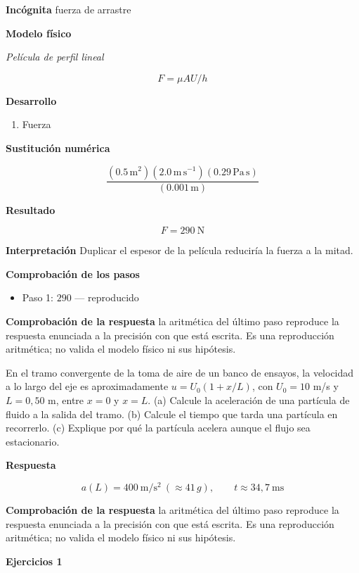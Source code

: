 \documentclass[10pt,openany]{book}
\begin{document}
\noindent\textbf{Incógnita}
fuerza de arrastre

\noindent\textbf{Modelo físico}

\noindent\textit{Película de perfil lineal}

\[
F = \mu A U/h
\]

\noindent\textbf{Desarrollo}
\begin{enumerate}
\item
Fuerza
\end{enumerate}

\noindent\textbf{Sustitución numérica}

\[
\frac{\left(0.5\,\mathrm{m}^{2}\right) \left(2.0\,\mathrm{m}\,\mathrm{s}^{-1}\right) \left(0.29\,\mathrm{Pa}\,\mathrm{s}\right)}{\left(0.001\,\mathrm{m}\right)}
\]

\noindent\textbf{Resultado}

\[
F = 290\ \mathrm{N}
\]

\noindent\textbf{Interpretación}
Duplicar el espesor de la película reduciría la fuerza a la mitad.

\noindent\textbf{Comprobación de los pasos}
\begin{itemize}
\item Paso 1: $290$ — reproducido
\end{itemize}

\noindent\textbf{Comprobación de la respuesta} la aritmética del último paso reproduce la respuesta enunciada a la precisión con que está escrita. Es una reproducción aritmética; no valida el modelo físico ni sus hipótesis.

En el tramo convergente de la toma de aire de un banco de ensayos, la velocidad a lo largo del eje es aproximadamente \(u = U_0(1 + x/L)\), con \(U_0 = 10\) m/s y \(L = 0{,}50\) m, entre \(x = 0\) y \(x = L\). (a) Calcule la aceleración de una partícula de fluido a la salida del tramo. (b) Calcule el tiempo que tarda una partícula en recorrerlo. (c) Explique por qué la partícula acelera aunque el flujo sea estacionario.

\noindent\textbf{Respuesta}

\[
a(L) = 400\ \mathrm{m/s^{2}}\ (\approx 41\,g),\qquad t \approx 34{,}7\ \mathrm{ms}
\]

\noindent\textbf{Comprobación de la respuesta} la aritmética del último paso reproduce la respuesta enunciada a la precisión con que está escrita. Es una reproducción aritmética; no valida el modelo físico ni sus hipótesis.

\noindent\textbf{Ejercicios 1}
\end{document}
